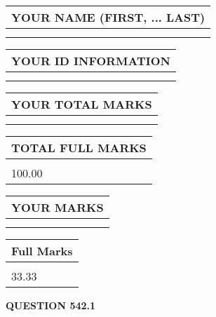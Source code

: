 \documentclass{ctexart}
\begin{document}
   
   
   
\newpage 
\setcounter{page}{ 
   542001 } 
   
   
   
   
\noindent\begin{tabular}{|l|}
\hline
YOUR NAME (FIRST, ... LAST)  \\
\hline
 \\ 
 \\ 
\hline
\end{tabular}
\hspace{0.05in} \begin{tabular}{|l|}
\hline
 YOUR   ID   INFORMATION  \\
\hline
 \\ 
 \\ 
\hline
\end{tabular}
   
   
\vspace{0.2in}\noindent\begin{tabular}{|l|}
\hline
YOUR TOTAL MARKS  \\
\hline
 \\ 
 \\ 
\hline
\end{tabular}
\hspace{0.05in} \begin{tabular}{|l|}
\hline
TOTAL FULL MARKS  \\
\hline
 \\ 
100.00 \\
\hline
\end{tabular}
   
   
 \vspace{0.2in}
 
 
 
 
   
   
  
\vspace{0.2in}
  
\noindent\begin{tabular}{|l|}
\hline
 YOUR MARKS  \\
\hline
 \\ 
 \\ 
\hline
\end{tabular}
\hspace{0.05in} \begin{tabular}{|l|}
\hline
 Full Marks  \\
\hline
 \\ 
33.33 \\
\hline
\end{tabular}
{\textbf{\Large{QUESTION
542.1 
}}}
  
\end{document}
